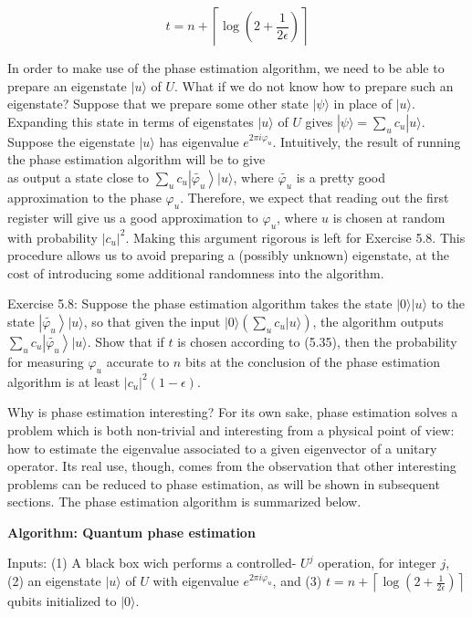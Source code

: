 \begin{equation*}
t=n+\left\lceil\log \left(2+\frac{1}{2 \epsilon}\right)\right\rceil \tag{5.35}
\end{equation*}

In order to make use of the phase estimation algorithm, we need to be able to prepare an eigenstate $|u\rangle$ of $U$. What if we do not know how to prepare such an eigenstate? Suppose that we prepare some other state $|\psi\rangle$ in place of $|u\rangle$. Expanding this state in terms of eigenstates $|u\rangle$ of $U$ gives $|\psi\rangle=\sum_{u} c_{u}|u\rangle$. Suppose the eigenstate $|u\rangle$ has eigenvalue $e^{2 \pi i \varphi_{u}}$. Intuitively, the result of running the phase estimation algorithm will be to give\\
as output a state close to $\sum_{u} c_{u}\left|\widetilde{\varphi_{u}}\right\rangle|u\rangle$, where $\widetilde{\varphi_{u}}$ is a pretty good approximation to the phase $\varphi_{u}$. Therefore, we expect that reading out the first register will give us a good approximation to $\varphi_{u}$, where $u$ is chosen at random with probability $\left|c_{u}\right|^{2}$. Making this argument rigorous is left for Exercise 5.8. This procedure allows us to avoid preparing a (possibly unknown) eigenstate, at the cost of introducing some additional randomness into the algorithm.

Exercise 5.8: Suppose the phase estimation algorithm takes the state $|0\rangle|u\rangle$ to the state $\left|\widetilde{\varphi_{u}}\right\rangle|u\rangle$, so that given the input $|0\rangle\left(\sum_{u} c_{u}|u\rangle\right)$, the algorithm outputs $\sum_{u} c_{u}\left|\widetilde{\varphi_{u}}\right\rangle|u\rangle$. Show that if $t$ is chosen according to (5.35), then the probability for measuring $\varphi_{u}$ accurate to $n$ bits at the conclusion of the phase estimation algorithm is at least $\left|c_{u}\right|^{2}(1-\epsilon)$.

Why is phase estimation interesting? For its own sake, phase estimation solves a problem which is both non-trivial and interesting from a physical point of view: how to estimate the eigenvalue associated to a given eigenvector of a unitary operator. Its real use, though, comes from the observation that other interesting problems can be reduced to phase estimation, as will be shown in subsequent sections. The phase estimation algorithm is summarized below.

\textbf{Algorithm: Quantum phase estimation}

Inputs: (1) A black box wich performs a controlled- $U^{j}$ operation, for integer $j$, (2) an eigenstate $|u\rangle$ of $U$ with eigenvalue $e^{2 \pi i \varphi_{u}}$, and (3) $t=n+\left\lceil\log \left(2+\frac{1}{2 \epsilon}\right)\right\rceil$ qubits initialized to $|0\rangle$.

